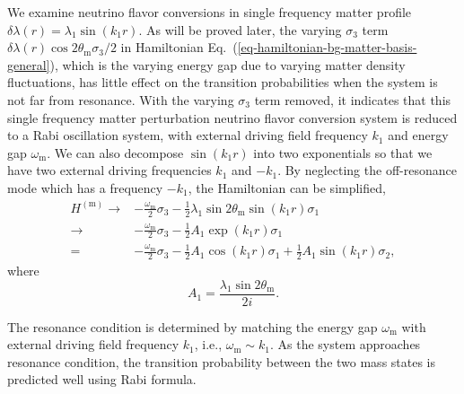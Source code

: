 \documentclass[%
reprint,
 amsmath,amssymb,
 prd,
]{revtex4-1}
\begin{document}
We examine neutrino flavor conversions in single frequency matter profile $\delta\lambda(r) = \lambda_1 \sin(k_1 r)$. As will be proved later, the varying $\sigma_3$ term $\delta\lambda(r) \cos 2\theta_{\mathrm m} \sigma_3/2$ in Hamiltonian Eq.~(\ref{eq-hamiltonian-bg-matter-basis-general}), which is the varying energy gap due to varying matter density fluctuations, has little effect on the transition probabilities when the system is not far from resonance. With the varying $\sigma_3$ term removed, it indicates that this single frequency matter perturbation neutrino flavor conversion system is reduced to a Rabi oscillation system, with external driving field frequency $k_1$ and energy gap $\omega_{\mathrm m}$. We can also decompose $\sin( k_1 r )$ into two exponentials so that we have two external driving frequencies $k_1$ and $-k_1$. By neglecting the off-resonance mode which has a frequency $-k_1$, the Hamiltonian can be simplified,
\begin{align}
H^{(\mathrm{m})} \to & -\frac{\omega_{\mathrm m}}{2} \sigma_3  - \frac{1}{2} \lambda_1 \sin 2\theta_{\mathrm m} \sin( k_1 r ) \sigma_1\label{eq-hamiltonian-bg-matter-basis-single-frequency} \\
\to & -\frac{\omega_{\mathrm m}}{2} \sigma_3  - \frac{1}{2} A_1 \exp (k_1 r) \sigma_1 \nonumber \\
= & -\frac{\omega_{\mathrm m}}{2} \sigma_3  - \frac{1}{2} A_1 \cos ( k_1 r)  \sigma_1 + \frac{1}{2} A_1\sin(k_1 r) \sigma_2,\nonumber
\end{align}
where
\begin{equation}
A_1 = \frac{\lambda_1 \sin 2\theta_{\mathrm m} }{2i}.
\label{eq-define-a1}
\end{equation}

The resonance condition is determined by matching the energy gap $\omega_{\mathrm m}$ with external driving field frequency $k_1$, i.e., $\omega_{\mathrm m} \sim k_1$. As the system approaches resonance condition, the transition probability between the two mass states is predicted well using Rabi formula.
\end{document}
